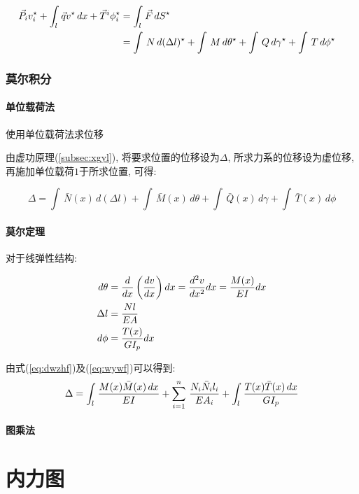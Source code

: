 \begin{align}\label{eq:xgyl}
    {\vec P_i}{v_i^\star} + {\int_l\,{\vec q}v^{\star}\,dx} + {{\vec T^i}{\phi^\star_i}}%
    &= \int_l\,{\vec F}\,d{S^{\star}}\cr
    &= \int\,N\,d(\Delta l)^\star + \int\,M\,d\theta^\star + \int\,Q\,d\gamma^\star + \int\,T\,d\phi^\star
\end{align}

\subsection{莫尔积分}

\subsubsection{单位载荷法}
{\imp 使用单位载荷法求位移}\par
由虚功原理(\ref{subsec:xgyl}), 将要求位置的位移设为$\Delta$, 所求力系的位移设为虚位移,%
再施加单位载荷$1$于所求位置, 可得:

\begin{equation}
    \label{eq:dwzhf}
    \Delta = {\int\,{\bar N}(x)\,d(\Delta l)} + {\int\,{\bar M}(x)\,d\theta} +%
    {\int\,{\bar Q}(x)\,d\gamma} + {\int\,{\bar T}(x)\,d\phi}
\end{equation}

\subsubsection{莫尔定理}

对于{\imp 线弹性结构}:

\begin{subequations}
    \begin{align}\label{eq:wywf}
        d\theta &= {d\over dx}\left({dv\over dx}\right)dx = {d^2v\over dx^2}dx = {M(x)\over EI}dx\\
        \Delta l &= {Nl\over EA}\\
        d\phi &= {T(x)\over GI_p}dx
    \end{align}
\end{subequations}

由式(\ref{eq:dwzhf})及(\ref{eq:wywf})可以得到:
\begin{equation}\label{eq:medl}
    \Delta = \int_l\,{M(x){\bar M}(x)\,dx\over EI} + \sum_{i=1}^n\,{N_i{\bar N}_il_i\over EA_i}%
    + \int_l\,{T(x){\bar T}(x)\,dx\over GI_p}
\end{equation}

\subsubsection{图乘法}


\chapter{内力图}
